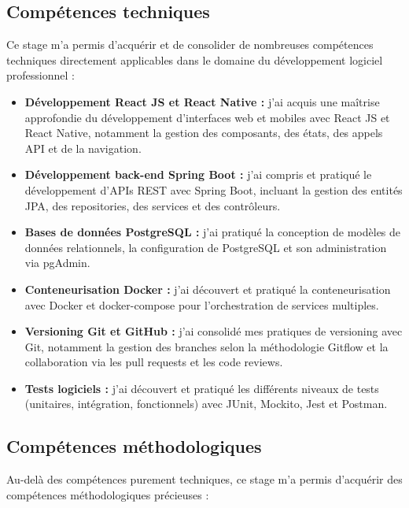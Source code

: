 \subsection{Compétences techniques}
Ce stage m'a permis d'acquérir et de consolider de nombreuses 
compétences techniques directement applicables dans le domaine 
du développement logiciel professionnel :

\begin{itemize}
    \item \textbf{Développement React JS et React Native :} j'ai 
    acquis une maîtrise approfondie du développement d'interfaces 
    web et mobiles avec React JS et React Native, notamment la 
    gestion des composants, des états, des appels API et de la navigation.
    
    \item \textbf{Développement back-end Spring Boot :} j'ai compris 
    et pratiqué le développement d'APIs REST avec Spring Boot, incluant 
    la gestion des entités JPA, des repositories, des services et 
    des contrôleurs.
    
    \item \textbf{Bases de données PostgreSQL :} j'ai pratiqué la 
    conception de modèles de données relationnels, la configuration 
    de PostgreSQL et son administration via pgAdmin.
    
    \item \textbf{Conteneurisation Docker :} j'ai découvert et 
    pratiqué la conteneurisation avec Docker et docker-compose 
    pour l'orchestration de services multiples.
    
    \item \textbf{Versioning Git et GitHub :} j'ai consolidé mes 
    pratiques de versioning avec Git, notamment la gestion des 
    branches selon la méthodologie Gitflow et la collaboration 
    via les pull requests et les code reviews.
    
    \item \textbf{Tests logiciels :} j'ai découvert et pratiqué 
    les différents niveaux de tests (unitaires, intégration, 
    fonctionnels) avec JUnit, Mockito, Jest et Postman.
\end{itemize}

\subsection{Compétences méthodologiques}
Au-delà des compétences purement techniques, ce stage m'a permis 
d'acquérir des compétences méthodologiques précieuses :

